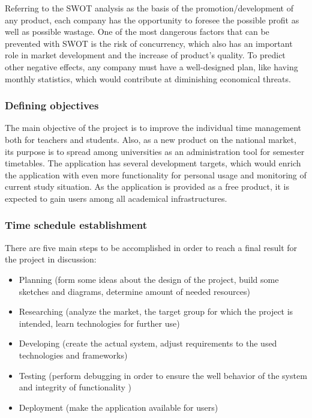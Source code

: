 Referring to the SWOT analysis as the basis of the promotion/development of any product, each company has the opportunity to foresee the possible profit as well as possible wastage. One of the most dangerous factors that can be prevented with SWOT is the risk of concurrency, which also has an important role in market development and the increase of product's quality. To predict other negative effects, any company must have a well-designed plan, like having monthly statistics, which would contribute at diminishing economical threats.

\subsubsection{Defining objectives}
The main objective of the project is to improve the individual time management both for teachers and students. Also, as a new product on the national market, its purpose is to spread among universities as an administration tool for semester timetables. The application has several development targets, which would enrich the application with even more functionality for personal usage and monitoring of current study situation. As the application is provided as a free product, it is expected to gain users among all academical infrastructures.

\subsubsection{Time schedule establishment}
There are five main steps to be accomplished in order to reach a final result for the project in discussion:
\begin{itemize}
  \item Planning (form some ideas about the design of the project, build some sketches and diagrams, determine amount of needed resources)
  \item Researching (analyze the market, the target group for which the project is intended, learn technologies for further use)
  \item Developing (create the actual system, adjust requirements to the used technologies and frameworks)
  \item Testing (perform debugging in order to ensure the well behavior of the system and integrity of functionality )
  \item Deployment (make the application available for users)
\end{itemize}

